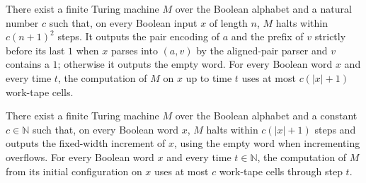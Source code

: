 \begin{theorem}
\label{Turing.FinTM.computesFunInTime_stripLast_spaceUsed}
\leanok
{}
There exist a finite Turing machine $M$ over the Boolean alphabet and a natural number
$c$ such that, on every Boolean input $x$ of length $n$, $M$ halts within $c(n+1)^2$
steps. It outputs the pair encoding of $a$ and the prefix of $v$ strictly before its
last $1$ when $x$ parses into $(a,v)$ by the aligned-pair parser and $v$ contains a $1$;
otherwise it outputs the empty word. For every Boolean word $x$ and every time $t$, the
computation of $M$ on $x$ up to time $t$ uses at most $c(|x|+1)$ work-tape cells.
\end{theorem}

\begin{theorem}
\label{Turing.FinTM.computesFunInTime_incFixed_spaceUsed}
\leanok
{}
There exist a finite Turing machine $M$ over the Boolean alphabet and a constant
$c\in\mathbb{N}$ such that, on every Boolean word $x$, $M$ halts within $c(|x|+1)$ steps
and outputs the fixed-width increment of $x$, using the empty word when incrementing
overflows. For every Boolean word $x$ and every time $t\in\mathbb{N}$, the computation
of $M$ from its initial configuration on $x$ uses at most $c$ work-tape cells through
step $t$.
\end{theorem}

